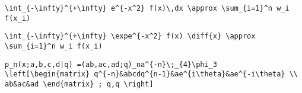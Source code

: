 \newsavebox\CFMM
\begin{lrbox}{\CFMM}
 \begin{minipage}[t]{0.82\textwidth}
  \lstinline[language={[latex]TeX},mathescape,breaklines=true]""
 \end{minipage}
\end{lrbox}
\newsavebox\CFMA
\begin{lrbox}{\CFMA}
 \begin{minipage}[t]{0.82\textwidth}
  \lstinline[language={[latex]TeX},mathescape,breaklines=true]""
 \end{minipage}
\end{lrbox}
\newsavebox\CGT
\begin{lrbox}{\CGT}
 \begin{minipage}[t]{0.82\textwidth}
  \lstinline[language={[latex]TeX},mathescape,breaklines=true]"\int_{-\infty}^{+\infty} e^{-x^2} f(x)\,dx \approx \sum_{i=1}^n w_i f(x_i)"
 \end{minipage}
\end{lrbox}
\newsavebox\CGST
\begin{lrbox}{\CGST}
 \begin{minipage}[t]{0.82\textwidth}
  \lstinline[language={[latex]TeX},mathescape,breaklines=true]"\int_{-\infty}^{+\infty} \expe^{-x^2} f(x) \diff{x} \approx \sum_{i=1}^n w_i f(x_i)"
 \end{minipage}
\end{lrbox}
\newsavebox\CGMM
\begin{lrbox}{\CGMM}
 \begin{minipage}[t]{0.82\textwidth}
  \lstinline[language={[latex]TeX},mathescape,breaklines=true]""
 \end{minipage}
\end{lrbox}
\newsavebox\CGMA
\begin{lrbox}{\CGMA}
 \begin{minipage}[t]{0.82\textwidth}
  \lstinline[language={[latex]TeX},mathescape,breaklines=true]""
 \end{minipage}
\end{lrbox}
\newsavebox\CHT
\begin{lrbox}{\CHT}
 \begin{minipage}[t]{0.82\textwidth}
  \lstinline[language={[latex]TeX},mathescape,breaklines=true]"p_n(x;a,b,c,d|q) =(ab,ac,ad;q)_na^{-n}\;_{4}\phi_3 \left[\begin{matrix} q^{-n}&abcdq^{n-1}&ae^{i\theta}&ae^{-i\theta} \\ ab&ac&ad \end{matrix} ; q,q \right]"
 \end{minipage}
\end{lrbox}
